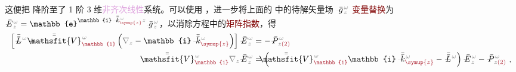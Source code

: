 这便把  降阶至了 1 阶 3 维\textcolor{Plum}{非齐次}\textcolor{Plum}{线性}系统。可以使用 ，进一步将上面的  中的待解矢量场 $\Xint{{}^{}_{\mathcolor{gray}{-}}}{10}{\bar{g}}^{\;\!\mathcolor{gray}{\omega}}_{\;\! \mathcolor{gray}{z}}$ \textcolor{Maroon}{变量替换}为 $\Xint{\mathcolor{gray}{-}}{25}{\bar{E}}^{\;\!\mathcolor{gray}{\omega}}_{\;\! \mathcolor{gray}{z}} = \mathbb{e}^{\mathbb{i} \Xint{\begin{smallmatrix} ~ \\ {}^{}_{\mathcolor{gray}{-}} \\ ~ \end{smallmatrix}}{15}{\bar{\bar{k}}}_{\textcolor{Maroon}{\symup{z}}}^{\;\! \mathcolor{gray}{\omega}} \mathcolor{gray}{z}} \Xint{{}^{}_{\mathcolor{gray}{-}}}{10}{\bar{g}}^{\;\!\mathcolor{gray}{\omega}}_{\;\! \mathcolor{gray}{z}}$，以消除方程中的\textcolor{Maroon}{矩阵指数}，得
\begin{subequations}
\begin{align}
	\left[ \Xint{\mathcolor{gray}{-}}{32}{\bar{\bar{L}}}^{\;\! \mathcolor{gray}{\omega}} + \Xint{\mathcolor{gray}{-}}{25}{\bar{\bar{\mathsfit{V}}}}^{\;\! \mathcolor{gray}{\omega}}_{\textcolor{Maroon}{\mathbb{1}}} \left( \mathcolor{gray}{\nabla_z} - \mathbb{i} \Xint{\begin{smallmatrix} ~ \\ {}^{}_{\mathcolor{gray}{-}} \\ ~ \end{smallmatrix}}{15}{\bar{\bar{k}}}_{\textcolor{Maroon}{\symup{z}}}^{\;\! \mathcolor{gray}{\omega}} \right) \right] \Xint{\mathcolor{gray}{-}}{295}{\bar{E}}^{\;\!\mathcolor{gray}{\omega}}_{\;\! \mathcolor{gray}{z}}
	&= - \Xint{\mathcolor{gray}{-}}{30}{\bar{P}}^{\;\! \mathcolor{gray}{\omega}}_{\;\! \mathcolor{gray}{z} \textcolor{Maroon}{(2)}} \label{eq:nonlinear(2)-wave_wkrho-simplify6-SVA-E} \\
	\Xint{\mathcolor{gray}{-}}{25}{\bar{\bar{\mathsfit{V}}}}^{\;\! \mathcolor{gray}{\omega}}_{\textcolor{Maroon}{\mathbb{1}}} \mathcolor{gray}{\nabla_z} \Xint{\mathcolor{gray}{-}}{295}{\bar{E}}^{\;\!\mathcolor{gray}{\omega}}_{\;\! \mathcolor{gray}{z}}
	&= \left( \Xint{\mathcolor{gray}{-}}{25}{\bar{\bar{\mathsfit{V}}}}^{\;\! \mathcolor{gray}{\omega}}_{\textcolor{Maroon}{\mathbb{1}}} \mathbb{i} \Xint{\begin{smallmatrix} ~ \\ {}^{}_{\mathcolor{gray}{-}} \\ ~ \end{smallmatrix}}{15}{\bar{\bar{k}}}_{\textcolor{Maroon}{\symup{z}}}^{\;\! \mathcolor{gray}{\omega}} - \Xint{\mathcolor{gray}{-}}{32}{\bar{\bar{L}}}^{\;\! \mathcolor{gray}{\omega}} \right) \Xint{\mathcolor{gray}{-}}{295}{\bar{E}}^{\;\!\mathcolor{gray}{\omega}}_{\;\! \mathcolor{gray}{z}} - \Xint{\mathcolor{gray}{-}}{30}{\bar{P}}^{\;\! \mathcolor{gray}{\omega}}_{\;\! \mathcolor{gray}{z} \textcolor{Maroon}{(2)}} ~,  \label{eq:nonlinear(2)-wave_wkrho-simplify6-SVA-E'}
\end{align}
\end{subequations}
